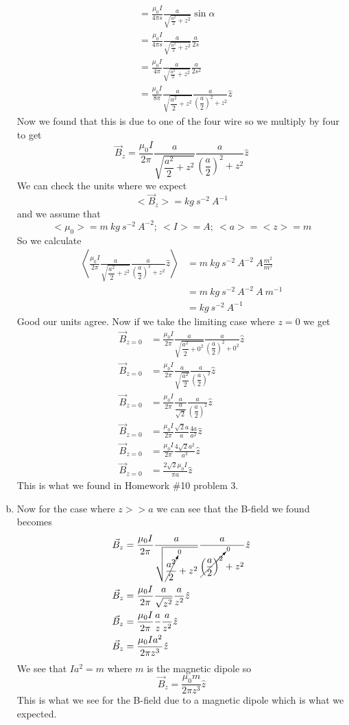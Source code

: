 \documentclass[11pt]{article}
\numberwithin{equation}{section}
\begin{document}
\begin{enumerate}[(a)]
\begin{align*}
&= \frac{\mu_0 I}{4\pi s}\frac{a}{\sqrt{\frac{a^2}{2} + z^2}}\sin\alpha\\
&= \frac{\mu_0 I}{4\pi s}\frac{a}{\sqrt{\frac{a^2}{2} + z^2}}\frac{a}{2s}\\
&= \frac{\mu_0 I}{4\pi}\frac{a}{\sqrt{\frac{a^2}{2} + z^2}}\frac{a}{2s^2}\\
&= \frac{\mu_0 I}{8\pi}\frac{a}{\sqrt{\dfrac{a^2}{2} + z^2}}\frac{a}{\left(\dfrac{a}{2}\right)^2 + z^2}\hat{z}
\end{align*}
Now we found that this is due to one of the four wire so we multiply by four to get
$$\vec{B}_z = \frac{\mu_0 I}{2\pi}\frac{a}{\sqrt{\dfrac{a^2}{2} + z^2}}\frac{a}{\left(\dfrac{a}{2}\right)^2 + z^2}\hat{z}$$
We can check the units where we expect 
$$<\vec{B}_z> = kg\ s^{-2}\ A^{-1}$$
and we assume that
$$<\mu_0> = m\ kg\ s^{-2}\ A^{-2};\ <I> = A;\ <a> = <z> = m$$
So we calculate
\begin{align*}
\left<\frac{\mu_0 I}{2\pi}\frac{a}{\sqrt{\dfrac{a^2}{2} + z^2}}\frac{a}{\left(\dfrac{a}{2}\right)^2 + z^2}\hat{z}\right> &=  m\ kg\ s^{-2}\ A^{-2}\ A \frac{m^2}{m^3}\\
&=  m\ kg\ s^{-2}\ A^{-2}\ A\ m^{-1}\\
&=  kg\ s^{-2}\ A^{-1} 
\end{align*}
Good our units agree. Now if we take the limiting case where $z=0$ we get
\begin{align*}
\vec{B}_{z=0} &= \frac{\mu_0 I}{2\pi}\frac{a}{\sqrt{\dfrac{a^2}{2} + 0^2}}\frac{a}{\left(\dfrac{a}{2}\right)^2 + 0^2}\hat{z}\\
\vec{B}_{z=0} &= \frac{\mu_0 I}{2\pi}\frac{a}{\sqrt{\dfrac{a^2}{2}}}\frac{a}{\left(\dfrac{a}{2}\right)^2}\hat{z}\\
\vec{B}_{z=0} &= \frac{\mu_0 I}{2\pi}\frac{a}{\dfrac{a}{\sqrt{2}}}\frac{a}{\left(\dfrac{a}{2}\right)^2}\hat{z}\\
\vec{B}_{z=0} &= \frac{\mu_0 I}{2\pi}\frac{\sqrt{2}a}{a}\frac{4a}{a^2}\hat{z}\\
\vec{B}_{z=0} &= \frac{\mu_0 I}{2\pi}\frac{4\sqrt{2}a^2}{a^3}\hat{z}\\
\vec{B}_{z=0} &= \frac{2\sqrt{2}\mu_0 I}{\pi a}\hat{z}
\end{align*}
This is what we found in Homework \#10 problem 3.

\item
Now for the case where $z>>a$ we can see that the B-field we found becomes
\begin{align*}
\vec{B}_z &= \frac{\mu_0 I}{2\pi}\frac{a}{\sqrt{\cancelto{0}{\dfrac{a^2}{2}} + z^2}}\frac{a}{\cancelto{0}{{\left(\dfrac{a}{2}\right)^2}} + z^2}\hat{z}\\
\vec{B}_z &= \frac{\mu_0 I}{2\pi}\frac{a}{\sqrt{z^2}}\frac{a}{z^2}\hat{z}\\
\vec{B}_z &= \frac{\mu_0 I}{2\pi}\frac{a}{z}\frac{a}{z^2}\hat{z}\\
\vec{B}_z &= \frac{\mu_0 Ia^2}{2\pi z^3}\hat{z}
\end{align*}
We see that $Ia^2=m$ where $m$ is the magnetic dipole so
$$\vec{B}_z = \frac{\mu_0 m}{2\pi z^3}\hat{z}$$
This is what we see for the B-field due to a magnetic dipole which is what we expected.


\end{enumerate}
\end{document}
